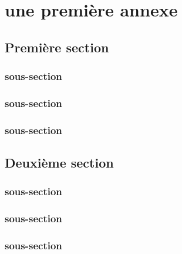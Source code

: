 \chapter{une première annexe}
\section{Première section}
\subsection{sous-section}
\lipsum[2]
\subsection{sous-section}
\lipsum[2]
\subsection{sous-section}
\lipsum[2]

\section{Deuxième section}
\subsection{sous-section}
\lipsum[2]
\subsection{sous-section}
\lipsum[2]
\subsection{sous-section}
\lipsum[2]

